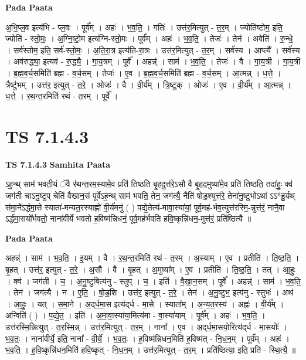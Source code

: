 \documentclass[17pt]{extarticle}
\begin{document}
\textbf{Pada Paata} \newline

अ॒भि॒प्ल॒व इत्य॑भि - प्ल॒वः । पूर्व᳚म् । अहः॑ । भ॒व॒ति॒ । गतिः॑ । उत्त॑र॒मित्युत् - त॒र॒म् । ज्योति॑ष्टोम॒ इति॒ ज्योति॑ - स्तो॒मः॒ । अ॒ग्नि॒ष्टो॒म इत्य॑ग्नि-स्तो॒मः । पूर्व᳚म् । अहः॑ । भ॒व॒ति॒ । तेजः॑ । तेन॑ । अवेति॑ । रु॒न्धे॒ । सर्व॑स्तोम॒ इति॒ सर्व॑-स्तो॒मः॒ । अ॒ति॒रा॒त्र इत्य॑ति-रा॒त्रः । उत्त॑र॒मित्युत् - त॒र॒म् । सर्व॑स्य । आप्त्यै᳚ । सर्व॑स्य । अव॑रुद्ध्या॒ इत्यव॑ - रु॒द्ध्यै॒ । गा॒य॒त्रम् । पूर्वे᳚ । अहन्न्॑ । साम॑ । भ॒व॒ति॒ । तेजः॑ । वै । गा॒य॒त्री । गा॒य॒त्री । ब्र॒ह्म॒व॒र्च॒समिति॑ ब्रह्म - व॒र्च॒सम् । तेजः॑ । ए॒व । ब्र॒ह्म॒व॒र्च॒समिति॑ ब्रह्म - व॒र्च॒सम् । आ॒त्मन्न् । ध॒त्ते॒ । त्रैष्टु॑भम् । उत्त॑र॒ इत्युत् - त॒रे॒ । ओजः॑ । वै । वी॒र्य᳚म् । त्रि॒ष्टुक् । ओजः॑ । ए॒व । वी॒र्य᳚म् । आ॒त्मन्न् । ध॒त्ते॒ । र॒थ॒न्त॒रमिति॑ रथं - त॒रम् । पूर्वे᳚ ।  \newline




\section*{ TS 7.1.4.3 }

\textbf{TS 7.1.4.3 } \newline
\textbf{Samhita Paata} \newline

ऽह॒न्थ् साम॑ भवती॒यं ॅवै र॑थन्त॒रम॒स्यामे॒व प्रति॑ तिष्ठति बृ॒हदुत्त॑रे॒ऽसौ वै बृ॒हद॒मुष्या॑मे॒व प्रति॑ तिष्ठति॒ तदा॑हुः॒ क्व॑ जग॑ती चाऽनु॒ष्टुप् चेति॑ वैखान॒सं पूर्वेऽह॒न्थ् साम॑ भवति॒ तेन॒ जग॑त्यै॒ नैति॑ षोड॒श्युत्त॑रे॒ तेना॑नु॒ष्टुभोऽथा॑ ऽऽ*हु॒र्यथ् स॑मा॒ने᳚ऽर्द्धमा॒से स्याता॑-मन्यत॒रस्याह्नो॑ वी॒र्य॑मनु॑ ( ) पद्ये॒तेत्य॑-मावा॒स्या॑यां॒ पूर्व॒मह॑-र्भव॒त्युत्त॑रस्मि॒-न्नुत्त॑रं॒ नानै॒वा ऽर्द्ध॑मा॒सयो᳚र्भवतो॒ नाना॑वीर्ये भवतो ह॒विष्म॑न्निधनं॒ पूर्व॒मह॑र्भवति हवि॒ष्कृन्नि॑धन॒-मुत्त॑रं॒ प्रति॑ष्ठित्यै ॥ \newline

\textbf{Pada Paata} \newline

अहन्न्॑ । साम॑ । भ॒व॒ति॒ । इ॒यम् । वै । र॒थ॒न्त॒रमिति॑ रथं - त॒रम् । अ॒स्याम् । ए॒व । प्रतीति॑ । ति॒ष्ठ॒ति॒ । बृ॒हत् । उत्त॑र॒ इत्युत् - त॒रे॒ । अ॒सौ । वै । बृ॒हत् । अ॒मुष्या᳚म् । ए॒व । प्रतीति॑ । ति॒ष्ठ॒ति॒ । तत् । आ॒हुः॒ । क्व॑ । जग॑ती । च॒ । अ॒नु॒ष्टुबित्य॑नु - स्तुप् । च॒ । इति॑ । वै॒खा॒न॒सम् । पूर्वे᳚ । अहन्न्॑ । साम॑ । भ॒व॒ति॒ । तेन॑ । जग॑त्यै । न । ए॒ति॒ । षो॒ड॒शि । उत्त॑र॒ इत्युत् - त॒रे॒ । तेन॑ । अ॒नु॒ष्टुभ॒ इत्य॑नु - स्तुभः॑ । अथ॑ । आ॒हुः॒ । यत् । स॒मा॒ने । अ॒द्‌र्ध॒मा॒स इत्य॑द्‌र्ध - मा॒से । स्याता᳚म् । अ॒न्य॒त॒रस्य॑ । अह्नः॑ । वी॒र्य᳚म् । अन्विति॑ ( ) । प॒द्ये॒त॒ । इति॑ । अ॒मा॒वा॒स्या॑या॒मित्य॑मा - वा॒स्या॑याम् । पूर्व᳚म् । अहः॑ । भ॒व॒ति॒ । उत्त॑रस्मि॒न्नित्युत् - त॒र॒स्मि॒न्न् । उत्त॑र॒मित्युत् - त॒र॒म् । नाना᳚ । ए॒व । अ॒द्‌र्ध॒मा॒सयो॒रित्य॑द्‌र्ध - मा॒सयोः᳚ । भ॒व॒तः॒ । नाना॑वीर्ये॒ इति॒ नाना᳚ - वी॒र्ये॒ । भ॒व॒तः॒ । ह॒विष्म॑न्निधन॒मिति॑ ह॒विष्म॑त् - नि॒ध॒न॒म् । पूर्व᳚म् । अहः॑ । भ॒व॒ति॒ । ह॒वि॒ष्कृन्नि॑धन॒मिति॑ हवि॒ष्कृत् - नि॒ध॒न॒म् । उत्त॑र॒मित्युत् - त॒र॒म् । प्रति॑ष्ठित्या॒ इति॒ प्रति॑ - स्थि॒त्यै॒ ॥  \newline
\end{document}
